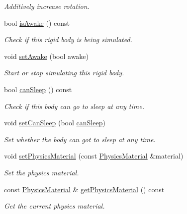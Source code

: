 \begin{DoxyCompactItemize}
\begin{DoxyCompactList}\small\item\em Additively increase rotation. \end{DoxyCompactList}\item 
bool \mbox{\hyperlink{classr3_1_1_rigid_body_a162bb9f31e5214001dabb1bdd94a9fbf}{is\+Awake}} () const
\begin{DoxyCompactList}\small\item\em Check if this rigid body is being simulated. \end{DoxyCompactList}\item 
void \mbox{\hyperlink{classr3_1_1_rigid_body_acd934e55a7f2f09d91f62ded40ebb325}{set\+Awake}} (bool awake)
\begin{DoxyCompactList}\small\item\em Start or stop simulating this rigid body. \end{DoxyCompactList}\item 
bool \mbox{\hyperlink{classr3_1_1_rigid_body_a1ed88cb4d77383c43c9058cecacbd407}{can\+Sleep}} () const
\begin{DoxyCompactList}\small\item\em Check if this body can go to sleep at any time. \end{DoxyCompactList}\item 
void \mbox{\hyperlink{classr3_1_1_rigid_body_ac630b9cb1a8fbb50356aa46330f5f2a6}{set\+Can\+Sleep}} (bool \mbox{\hyperlink{classr3_1_1_rigid_body_a1ed88cb4d77383c43c9058cecacbd407}{can\+Sleep}})
\begin{DoxyCompactList}\small\item\em Set whether the body can got to sleep at any time. \end{DoxyCompactList}\item 
void \mbox{\hyperlink{classr3_1_1_rigid_body_a31a0677792f54e49a6fb2cc453fe2169}{set\+Physics\+Material}} (const \mbox{\hyperlink{classr3_1_1_physics_material}{Physics\+Material}} \&material)
\begin{DoxyCompactList}\small\item\em Set the physics material. \end{DoxyCompactList}\item 
const \mbox{\hyperlink{classr3_1_1_physics_material}{Physics\+Material}} \& \mbox{\hyperlink{classr3_1_1_rigid_body_ab73b4319a248ebf6557851afa5050481}{get\+Physics\+Material}} () const
\begin{DoxyCompactList}\small\item\em Get the current physics material. \end{DoxyCompactList}\item 

\end{DoxyCompactItemize}
